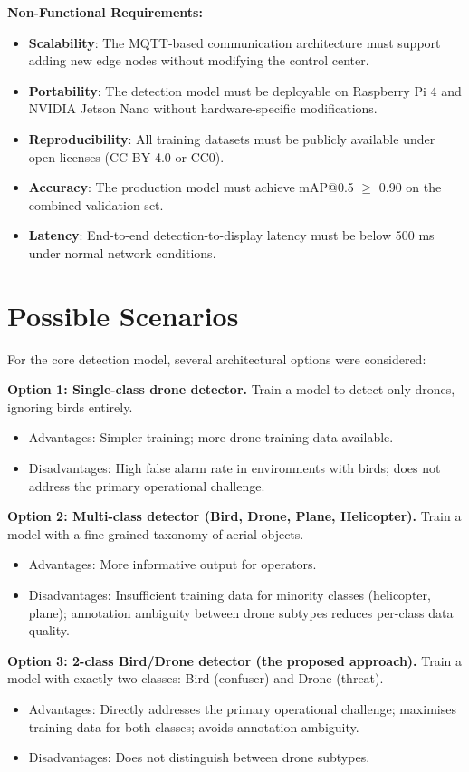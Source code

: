 \documentclass[12pt,a4paper]{report}
\begin{document}
\textbf{Non-Functional Requirements:}
\begin{itemize}
  \item \textbf{Scalability}: The MQTT-based communication architecture must
        support adding new edge nodes without modifying the control center.
  \item \textbf{Portability}: The detection model must be deployable on
        Raspberry Pi 4 and NVIDIA Jetson Nano without hardware-specific
        modifications.
  \item \textbf{Reproducibility}: All training datasets must be publicly
        available under open licenses (CC BY 4.0 or CC0).
  \item \textbf{Accuracy}: The production model must achieve mAP@0.5 $\geq$
        0.90 on the combined validation set.
  \item \textbf{Latency}: End-to-end detection-to-display latency must be
        below 500 ms under normal network conditions.
\end{itemize}

\section{Possible Scenarios}

For the core detection model, several architectural options were considered:

\textbf{Option 1: Single-class drone detector.}
Train a model to detect only drones, ignoring birds entirely.
\begin{itemize}
  \item Advantages: Simpler training; more drone training data available.
  \item Disadvantages: High false alarm rate in environments with birds;
        does not address the primary operational challenge.
\end{itemize}

\textbf{Option 2: Multi-class detector (Bird, Drone, Plane, Helicopter).}
Train a model with a fine-grained taxonomy of aerial objects.
\begin{itemize}
  \item Advantages: More informative output for operators.
  \item Disadvantages: Insufficient training data for minority classes
        (helicopter, plane); annotation ambiguity between drone subtypes
        reduces per-class data quality.
\end{itemize}

\textbf{Option 3: 2-class Bird/Drone detector (the proposed approach).}
Train a model with exactly two classes: Bird (confuser) and Drone (threat).
\begin{itemize}
  \item Advantages: Directly addresses the primary operational challenge;
        maximises training data for both classes; avoids annotation ambiguity.
  \item Disadvantages: Does not distinguish between drone subtypes.
\end{itemize}
\end{document}
